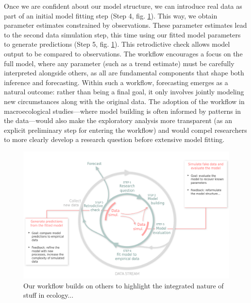 \documentclass[11pt]{article}
\begin{document}
Once we are confident about our model structure, we can introduce real data as part of an initial model fitting step (Step 4, fig. \ref{fig:workflow}). This way, we obtain parameter estimates constrained by observations. 
These parameter estimates lead to the second data simulation step, this time using our fitted model parameters to generate predictions (Step 5, fig. \ref{fig:workflow}). This retrodictive check allows model output to be compared to observations. %
The workflow encourages a focus on the full model, where any parameter (such as a trend estimate) must be carefully interpreted alongside others, as all are fundamental components that shape both inference and forecasting. 
Within such a workflow, forecasting emerges as a natural outcome: rather than being a final goal, it only involves jointly modeling new circumstances along with the original data. The adoption of the workflow in macroecological studies---where model building is often informed by patterns in the data---would also make the exploratory analysis more transparent (as an explicit preliminary step for entering the workflow) and would compel researchers to more clearly develop a research question before extensive model fitting. 

\begin{figure}[h]
	\centering
    \hspace*{-1.5cm}
	\includegraphics{figures/figure_worflow_wsteps}
	\caption{Our workflow builds on others \citep{Betancourt2020, Wolkovich2024, McElreath2018, Schoot2021} to highlight the integrated nature of stuff in ecology...} 
	\label{fig:workflow}
\end{figure}
\end{document}
